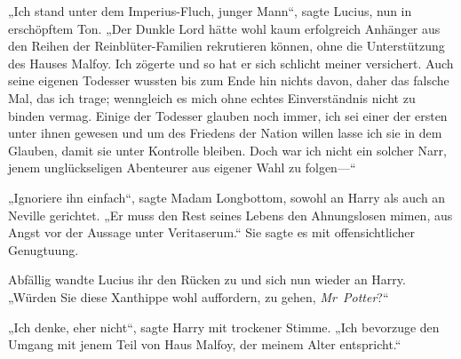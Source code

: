 „Ich stand unter dem Imperius-Fluch, junger Mann“, sagte Lucius, nun in erschöpftem Ton. „Der Dunkle Lord hätte wohl kaum erfolgreich Anhänger aus den Reihen der Reinblüter-Familien rekrutieren können, ohne die Unterstützung des Hauses Malfoy. Ich zögerte und so hat er sich schlicht meiner versichert. Auch seine eigenen Todesser wussten bis zum Ende hin nichts davon, daher das falsche Mal, das ich trage; wenngleich es mich ohne echtes Einverständnis nicht zu binden vermag. Einige der Todesser glauben noch immer, ich sei einer der ersten unter ihnen gewesen und um des Friedens der Nation willen lasse ich sie in dem Glauben, damit sie unter Kontrolle bleiben. Doch war ich nicht ein solcher Narr, jenem unglückseligen Abenteurer aus eigener Wahl zu folgen—“

„Ignoriere ihn einfach“, sagte Madam Longbottom, sowohl an Harry als auch an Neville gerichtet. „Er muss den Rest seines Lebens den Ahnungslosen mimen, aus Angst vor der Aussage unter Veritaserum.“ Sie sagte es mit offensichtlicher Genugtuung.

Abfällig wandte Lucius ihr den Rücken zu und sich nun wieder an Harry. „Würden Sie diese Xanthippe wohl auffordern, zu gehen, \emph{Mr~Potter}?“%

„Ich denke, eher nicht“, sagte Harry mit trockener Stimme. „Ich bevorzuge den Umgang mit jenem Teil von Haus Malfoy, der meinem Alter entspricht.“

